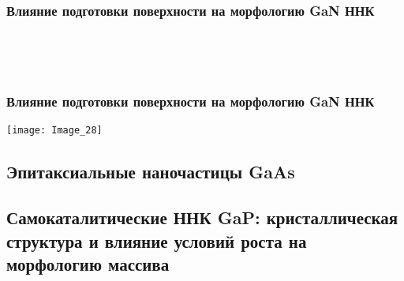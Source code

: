 \begin{frame}
	\frametitle{Влияние подготовки поверхности на морфологию GaN ННК}
	\centering
\begin{minipage}[t]{0.31\linewidth}
\end{minipage}
\\
\bigskip
\begin{minipage}[t]{0.31\linewidth}
	\end{minipage}
\begin{minipage}[t]{0.31\linewidth}
\end{minipage}
\begin{minipage}[t]{0.31\linewidth}
\end{minipage}
\\
\bigskip
\begin{minipage}[t]{0.31\linewidth}
\end{minipage}
\begin{minipage}[t]{0.31\linewidth}
\end{minipage}
\begin{minipage}[t]{0.31\linewidth}
\end{minipage}
\end{frame}

\begin{frame}
	\frametitle{Влияние подготовки поверхности на морфологию GaN ННК}
	\centering
	\texttt{[image: Image\_28]}
\end{frame}

\subsection{Эпитаксиальные наночастицы GaAs}

\subsection{Самокаталитические ННК GaP: кристаллическая структура и влияние условий роста на морфологию массива}